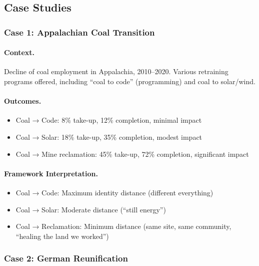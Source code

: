 \subsection{Case Studies}

\subsubsection{Case 1: Appalachian Coal Transition}

\paragraph{Context.}
Decline of coal employment in Appalachia, 2010--2020. Various retraining 
programs offered, including ``coal to code'' (programming) and coal to 
solar/wind.

\paragraph{Outcomes.}
\begin{itemize}
    \item Coal → Code: 8\% take-up, 12\% completion, minimal impact
    \item Coal → Solar: 18\% take-up, 35\% completion, modest impact
    \item Coal → Mine reclamation: 45\% take-up, 72\% completion, significant impact
\end{itemize}

\paragraph{Framework Interpretation.}
\begin{itemize}
    \item Coal → Code: Maximum identity distance (different everything)
    \item Coal → Solar: Moderate distance (``still energy'')
    \item Coal → Reclamation: Minimum distance (same site, same community, ``healing the land we worked'')
\end{itemize}

\subsubsection{Case 2: German Reunification}

